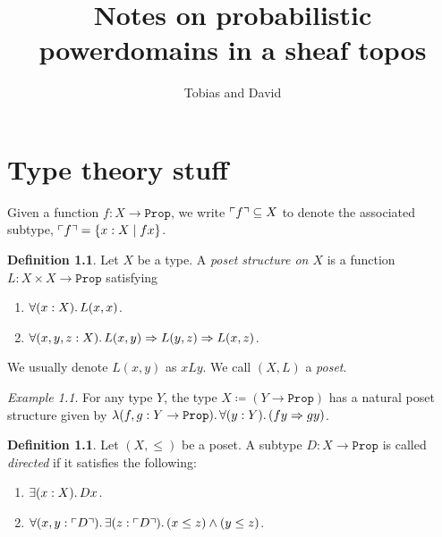 \documentclass[11pt, article]{memoir}
\theoremstyle{plain}
\theoremstyle{definition}
\newtheorem{definition}[theorem]{Definition}
\theoremstyle{remark}
\newtheorem{example}[theorem]{Example}
\renewcommand{\ss}{\subseteq}
\DeclarePairedDelimiter{\subtype}{\ulcorner}{\urcorner}
\newcommand{\const}[1]{\mathtt{#1}}
\newcommand{\Prop}{\const{Prop}}
\newcommand{\imp}{\Rightarrow}
\begin{document}
\title{Notes on probabilistic powerdomains in a sheaf topos}

\author{Tobias and David}

\maketitle

\tableofcontents*


\chapter{Type theory stuff}

Given a function $f:X\to\Prop$, we write $\subtype{f}\ss X$ to denote the associated subtype, $\subtype{f}=\{x:X\mid fx\}$.

\begin{definition}
Let $X$ be a type. A \emph{poset structure on $X$} is a function $L:X\times X\to\Prop$ satisfying
\begin{enumerate}
	\item $\forall(x:X)\ldotp L(x,x)$.
	\item $\forall(x,y,z:X)\ldotp L(x,y)\imp L(y,z)\imp L(x,z)$.
\end{enumerate}
We usually denote $L(x,y)$ as $x L y$. We call $(X,L)$ a \emph{poset}.
\end{definition}

\begin{example}
For any type $Y$, the type $X\coloneqq (Y\to\Prop)$ has a natural poset structure given by $\lambda(f,g:Y\to\Prop)\ldotp\forall(y:Y)\ldotp (fy\imp gy)$.
\end{example}

\begin{definition}
Let $(X,\leq)$ be a poset. A subtype $D:X\to\Prop$ is called \emph{directed} if it satisfies the following:
\begin{enumerate}
	\item $\exists(x:X)\ldotp Dx$.
	\item $\forall(x,y:\subtype{D})\ldotp\exists(z:\subtype{D})\ldotp(x\leq z)\wedge (y\leq z)$.
\end{enumerate}
\end{definition}
\end{document}
